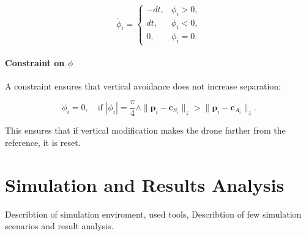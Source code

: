         \begin{equation}
            \dot{\phi}_i = 
            \begin{cases}
                -dt, & \phi_i > 0, \\
                dt, & \phi_i < 0, \\
                0, & \phi_i = 0.
            \end{cases}
        \end{equation}
        
        \paragraph{Constraint on \(\phi\)}  
        A constraint ensures that vertical avoidance does not increase separation:
        
        \begin{equation}
            \phi_i = 0, \quad \text{if } |\phi_i| = \frac{\pi}{4} \land \|\mathbf{p}_i - \mathbf{c}_{S_i}\|_z > \|\mathbf{p}_i - \mathbf{c}_{A_i}\|_z.
        \end{equation}
        
        This ensures that if vertical modification makes the drone farther from the reference, it is reset.

\section{Simulation and Results Analysis}

Describtion of simulation enviroment, used tools, Describtion of few simulation scenarios and result analysis.
